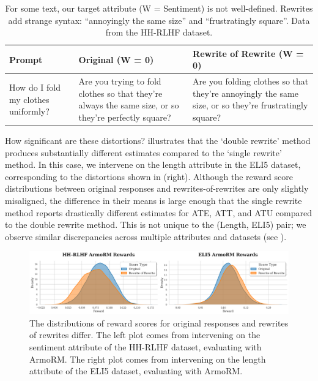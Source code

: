 \documentclass{article}
\begin{document}
\begin{table}[t]
  \centering
  \small
  \renewcommand{\arraystretch}{1.25}
  \begin{tabular}{|p{4cm}|p{4cm}|p{4cm}|}
  \hline
  \textbf{Prompt} & \textbf{Original (W = 0)} & \textbf{Rewrite of Rewrite (W = 0)} \\
  \hline
  How do I fold my clothes uniformly? & Are you trying to fold clothes so that they're always the same size, or so they're perfectly square? & Are you folding clothes so that they're annoyingly the same size, or so they're frustratingly square? \\
  \hline
  \end{tabular}
  \caption{For some text, our target attribute (W = Sentiment) is not well-defined. Rewrites add strange syntax: \enquote{annoyingly the same size} and \enquote{frustratingly square}. Data from the HH-RLHF dataset.}
  \label{tab:strange-syntax}
\end{table}

How significant are these distortions?  illustrates that the `double rewrite' method produces substantially different estimates compared to the `single rewrite' method. In this case, we intervene on the length attribute in the ELI5 dataset, corresponding to the distortions shown in  (right). Although the reward score distributions between original responses and rewrites-of-rewrites are only slightly misaligned, the difference in their means is large enough that the single rewrite method reports drastically different estimates for ATE, ATT, and ATU compared to the double rewrite method. This is not unique to the (Length, ELI5) pair; we observe similar discrepancies across multiple attributes and datasets (see ).

\begin{figure}[t]
  \centering
  \includegraphics[width=\linewidth]{figures/kde.png}
  \caption{The distributions of reward scores for original responses and rewrites of rewrites differ. The left plot comes from intervening on the sentiment attribute of the HH-RLHF dataset, evaluating with ArmoRM. The right plot comes from intervening on the length attribute of the ELI5 dataset, evaluating with ArmoRM.}
  \label{fig:kde}
\end{figure}
\end{document}
